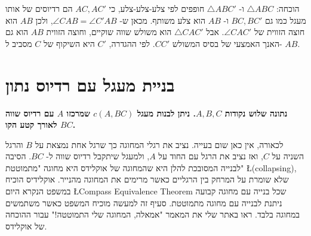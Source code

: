 \documentclass[12pt,a4paper]{article}
\begin{document}
\begin{center}
\vspace*{-6pt}
\vspace*{-8pt}
\end{center}
הוכחה:
$\triangle ABC$
ו-%
$\triangle ABC'$
חופפים לפי צלע-צלע-צלע, כי
$AC,AC'$
הם רדיוסים של אותו מעגל כמו גם
$BC,BC'$
ו-%
$AB$
הוא צלע משותף. מכאן ש-%
$\angle CAB = \angle C'AB$,
ולכן
$AB$
הוא חוצה הזווית של
$\angle CAC'$.
אבל
$\triangle CAC'$
הוא משולש שווה שוקיים, וחוצה הזווית
$AB$
הוא גם האנך האמצעי של בסיס המשולש
$CC'$.
לפי ההגדרה,
$C'$
היא השיקוף של
$C$
מסביב ל-%
$AB$.


\section{%
בניית מעגל עם רדיוס נתון
}\label{s.radius}

\textbf{%
נתונה שלוש נקודות
$A,B,C$.
ניתן לבנות מעגל
$c(A,BC)$
שמרכזו 
$A$
עם רדיוס שווה לאורך קטע הקו 
$BC$.
}

לכאורה, אין כאן שום בעייה. נציב את רגלי המחוגה כך שרגל אחת נמצאת על
$B$
והרגל השניה על
$C$,
ואז נציב את הרגל עם החוד על
$A$,
ולמעגל שיתקבל רדיוס שווה ל-%
$BC$.
הסיבה לבנייה המסובכת להלן היא שהמחוגה של אוקלידס היא מחוגה "מתמוטטת"
\L{(collapsing)},
שלא שומרת על המרחק בין הרגליים כאשר מרימים את המחוגה מהנייר. אוקלידיס הוכיח במשפט הנקרא היום
\L{Compass Equivalence Theorem}
שכל בנייה עם מחוגה קבועה ניתנת לבנייה עם מחוגה מתמוטטת. סעיף זה למעשה מוכיח המשפט כאשר משתמשים במחוגה בלבד. ראו באתר שלי את המאמר "אמאלה, המחוגה שלי התמוטטה!" עבור ההוכחה של אוקלידס.
\end{document}
